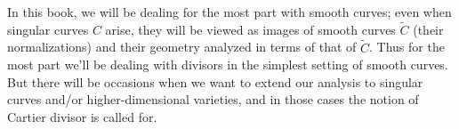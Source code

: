 In this book, we will be dealing for the most part with smooth curves; even when singular curves $C$ arise, they will be viewed as images of smooth curves $\tilde C$  (their normalizations) and their geometry analyzed in terms of that of $\tilde C$. Thus for the most part we'll be dealing with divisors in the simplest setting of smooth curves. But there will be occasions when we want to extend our analysis to singular curves and/or higher-dimensional varieties, and in those cases the notion of Cartier divisor is called for.

%
%
 
 
